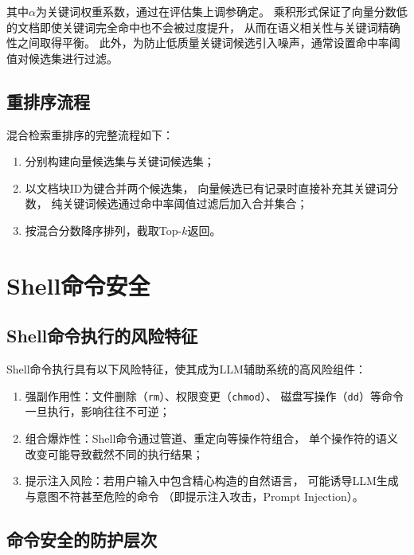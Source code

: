 其中$\alpha$为关键词权重系数，通过在评估集上调参确定。
乘积形式保证了向量分数低的文档即使关键词完全命中也不会被过度提升，
从而在语义相关性与关键词精确性之间取得平衡。
此外，为防止低质量关键词候选引入噪声，通常设置命中率阈值对候选集进行过滤。

\subsection{重排序流程}

混合检索重排序的完整流程如下：
\begin{enumerate}
    \item 分别构建向量候选集与关键词候选集；
    \item 以文档块ID为键合并两个候选集，
    向量候选已有记录时直接补充其关键词分数，
    纯关键词候选通过命中率阈值过滤后加入合并集合；
    \item 按混合分数降序排列，截取Top-$k$返回。
\end{enumerate}

\section{Shell命令安全}

\subsection{Shell命令执行的风险特征}

Shell命令执行具有以下风险特征，使其成为LLM辅助系统的高风险组件：

\begin{enumerate}
    \item 强副作用性：文件删除（\texttt{rm}）、权限变更（\texttt{chmod}）、
    磁盘写操作（\texttt{dd}）等命令一旦执行，影响往往不可逆；

    \item 组合爆炸性：Shell命令通过管道、重定向等操作符组合，
    单个操作符的语义改变可能导致截然不同的执行结果；

    \item 提示注入风险：若用户输入中包含精心构造的自然语言，
    可能诱导LLM生成与意图不符甚至危险的命令
    （即提示注入攻击，Prompt Injection）。
\end{enumerate}

\subsection{命令安全的防护层次}

